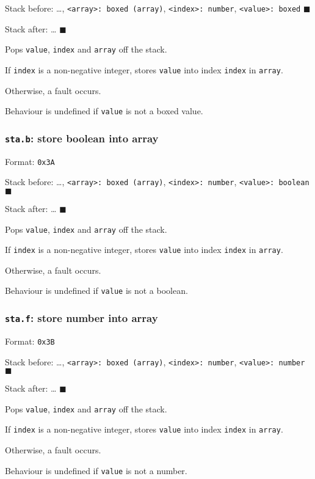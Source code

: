 Stack before: \ldots{}, \texttt{<array>: boxed (array)}, \texttt{<index>: number},
\texttt{<value>: boxed} \(\blacksquare\)

Stack after: \ldots{} \(\blacksquare\)

Pops \texttt{value}, \texttt{index} and \texttt{array} off the stack.

If \texttt{index} is a non-negative integer, stores \texttt{value} into index \texttt{index}
in \texttt{array}.

Otherwise, a fault occurs.

Behaviour is undefined if \texttt{value} is not a boxed value.

\subsubsection{\texttt{sta.b}: store boolean into array}
\label{sec:org8e9e3f6}
Format: \texttt{0x3A}

Stack before: \ldots{}, \texttt{<array>: boxed (array)}, \texttt{<index>: number},
\texttt{<value>: boolean} \(\blacksquare\)

Stack after: \ldots{} \(\blacksquare\)

Pops \texttt{value}, \texttt{index} and \texttt{array} off the stack.

If \texttt{index} is a non-negative integer, stores \texttt{value} into index \texttt{index}
in \texttt{array}.

Otherwise, a fault occurs.

Behaviour is undefined if \texttt{value} is not a boolean.

\subsubsection{\texttt{sta.f}: store number into array}
\label{sec:org3dfaf54}
Format: \texttt{0x3B}

Stack before: \ldots{}, \texttt{<array>: boxed (array)}, \texttt{<index>: number},
\texttt{<value>: number} \(\blacksquare\)

Stack after: \ldots{} \(\blacksquare\)

Pops \texttt{value}, \texttt{index} and \texttt{array} off the stack.

If \texttt{index} is a non-negative integer, stores \texttt{value} into index \texttt{index}
in \texttt{array}.

Otherwise, a fault occurs.

Behaviour is undefined if \texttt{value} is not a number.


